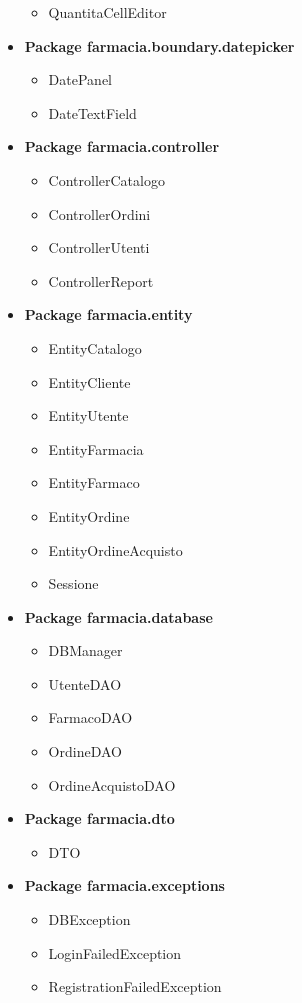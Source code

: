 \begin{itemize}
\begin{itemize}
		\item QuantitaCellEditor
	\end{itemize}
	\item \textbf{Package farmacia.boundary.datepicker}
	\begin{itemize}
		\item DatePanel
		\item DateTextField
	\end{itemize}
	\item \textbf{Package farmacia.controller}
	\begin{itemize}
		\item ControllerCatalogo
		\item ControllerOrdini
		\item ControllerUtenti
		\item ControllerReport
	\end{itemize}
	\item \textbf{Package farmacia.entity}
	\begin{itemize}
		\item EntityCatalogo
		\item EntityCliente
		\item EntityUtente
		\item EntityFarmacia
		\item EntityFarmaco
		\item EntityOrdine
		\item EntityOrdineAcquisto
		\item Sessione
	\end{itemize}
	\item \textbf{Package farmacia.database}
	\begin{itemize}
		\item DBManager
		\item UtenteDAO
		\item FarmacoDAO
		\item OrdineDAO
		\item OrdineAcquistoDAO
	\end{itemize}
	\item \textbf{Package farmacia.dto}
	\begin{itemize}
		\item DTO
	\end{itemize}
	\item \textbf{Package farmacia.exceptions}
	\begin{itemize}
		\item DBException
		\item LoginFailedException
		\item RegistrationFailedException

\end{itemize}
\end{itemize}
